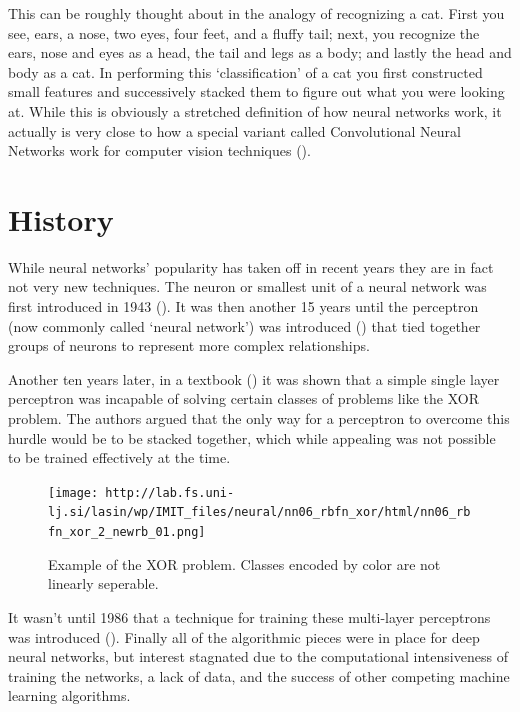 \documentclass[]{book}
\theoremstyle{definition}
\theoremstyle{definition}
\theoremstyle{definition}
\theoremstyle{remark}
\begin{document}
This can be roughly thought about in the analogy of recognizing a cat.
First you see, ears, a nose, two eyes, four feet, and a fluffy tail;
next, you recognize the ears, nose and eyes as a head, the tail and legs
as a body; and lastly the head and body as a cat. In performing this
`classification' of a cat you first constructed small features and
successively stacked them to figure out what you were looking at. While
this is obviously a stretched definition of how neural networks work, it
actually is very close to how a special variant called Convolutional
Neural Networks work for computer vision techniques (\citet{cnn_vis}).

\section{History}\label{history}

While neural networks' popularity has taken off in recent years they are
in fact not very new techniques. The neuron or smallest unit of a neural
network was first introduced in 1943 (\citet{mcculloch_neuron}). It was
then another 15 years until the perceptron (now commonly called `neural
network') was introduced (\citet{rosenblatt_perceptron}) that tied
together groups of neurons to represent more complex relationships.

Another ten years later, in a textbook (\citet{minsky_perceptrons}) it
was shown that a simple single layer perceptron was incapable of solving
certain classes of problems like the XOR problem. The authors argued
that the only way for a perceptron to overcome this hurdle would be to
be stacked together, which while appealing was not possible to be
trained effectively at the time.

\begin{figure}
\centering
\texttt{[image: http://lab.fs.uni-lj.si/lasin/wp/IMIT\_files/neural/nn06\_rbfn\_xor/html/nn06\_rbfn\_xor\_2\_newrb\_01.png]}
\caption{\label{fig:unnamed-chunk-1}Example of the XOR problem. Classes
encoded by color are not linearly seperable.}
\end{figure}

It wasn't until 1986 that a technique for training these multi-layer
perceptrons was introduced (\citet{backprop_1986}). Finally all of the
algorithmic pieces were in place for deep neural networks, but interest
stagnated due to the computational intensiveness of training the
networks, a lack of data, and the success of other competing machine
learning algorithms.
\end{document}
